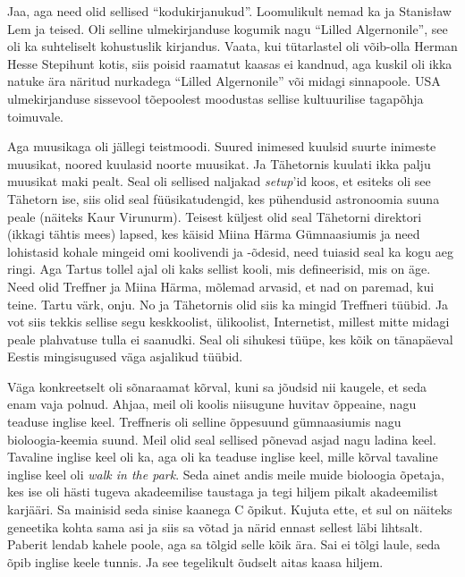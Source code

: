 
Jaa, aga need olid sellised \enquote{kodukirjanukud}. Loomulikult nemad 
ka ja Stanisław Lem ja teised. Oli selline ulmekirjanduse kogumik nagu \enquote{Lilled 
Algernonile}, see oli ka suhteliselt kohustuslik kirjandus. Vaata, kui 
tütarlastel oli võib-olla Herman Hesse Stepihunt kotis, siis poisid raamatut 
kaasas ei kandnud, aga kuskil oli ikka natuke ära näritud nurkadega \enquote{Lilled 
Algernonile} või midagi sinnapoole. USA ulmekirjanduse sissevool tõepoolest 
moodustas sellise kultuurilise tagapõhja toimuvale.

Aga muusikaga oli jällegi teistmoodi. Suured inimesed kuulsid suurte inimeste 
muusikat, noored kuulasid noorte muusikat. Ja Tähetornis  
kuulati ikka palju muusikat maki pealt. Seal oli sellised naljakad 
\emph{setup}'id koos, et esiteks oli see Tähetorn ise, siis olid seal 
füüsikatudengid, kes pühendusid astronoomia suuna peale (näiteks Kaur 
Virunurm). Teisest küljest olid seal Tähetorni 
direktori (ikkagi tähtis mees) lapsed, kes käisid Miina Härma 
Gümnaasiumis ja need lohistasid kohale 
mingeid omi koolivendi ja -õdesid, need tuiasid seal ka kogu aeg ringi. Aga 
Tartus tollel ajal oli kaks sellist kooli, mis  defineerisid, mis on äge. Need 
olid Treffner ja Miina Härma, mõlemad 
arvasid, et nad on paremad, kui teine. Tartu värk, onju. No ja Tähetornis olid 
siis ka mingid Treffneri tüübid. Ja vot siis tekkis sellise segu keskkoolist, 
ülikoolist, Internetist, millest mitte midagi peale plahvatuse tulla ei 
saanudki. Seal oli sihukesi tüüpe, kes kõik on tänapäeval Eestis mingisugused 
väga asjalikud tüübid.


Väga konkreetselt oli sõnaraamat kõrval, kuni sa jõudsid nii kaugele, et seda 
enam vaja polnud. Ahjaa, meil oli koolis  niisugune huvitav õppeaine, nagu 
teaduse inglise keel. Treffneris 
oli selline õppesuund gümnaasiumis nagu 
bioloogia-keemia suund. Meil olid seal sellised põnevad asjad nagu ladina keel. 
Tavaline inglise keel oli ka, aga oli ka teaduse inglise keel, mille 
kõrval tavaline inglise keel oli \emph{walk in the park}. Seda ainet andis 
meile muide bioloogia õpetaja, kes ise oli hästi tugeva akadeemilise taustaga ja  
tegi hiljem pikalt akadeemilist karjääri. Sa 
mainisid seda sinise kaanega C õpikut. Kujuta ette, et sul on näiteks geneetika 
kohta sama asi ja siis sa võtad ja närid ennast sellest läbi lihtsalt. Paberit lendab 
kahele poole, aga sa tõlgid selle kõik ära. Sai ei tõlgi laule, 
seda õpib inglise keele tunnis. Ja see tegelikult õudselt aitas kaasa hiljem.

